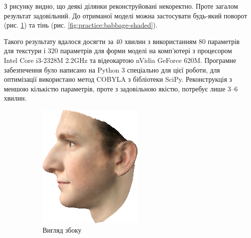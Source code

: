 З рисунку видно, що деякі ділянки реконструйовані некоректно.
Проте загалом результат задовільний.
До отриманої моделі можна застосувати будь-який поворот
(рис. \ref{fig:practice:babbage-profile})
та тінь
(рис. \ref{fig:practice:babbage-shaded}).

Такого результату вдалося досягти за $40$ хвилин
з використанням $80$ параметрів для текстури
і $320$ параметрів для форми моделі
на комп'ютері з процесором Intel Core i3-2328M 2.2GHz
та відеокартою nVidia GeForce 620M.
Програмне забезпечення було написано на Python 3 спеціально для цієї роботи,
для оптимізації використано метод COBYLA \cite{Powell1994} з бібліотеки SciPy.
Реконструкція з меншою кількістю параметрів,
проте з задовільною якістю,
потребує лише 3--6 хвилин.

\begin{figure}[h]
  \centering
  \begin{subfigure}[b]{0.4\textwidth}
    \centering
    \includegraphics[width=\textwidth]{images/babbage-profile}
    \caption{Вигляд збоку}
    \label{fig:practice:babbage-profile}
  \end{subfigure}
  \begin{subfigure}[b]{0.4\textwidth}

\end{subfigure}
\end{figure}
